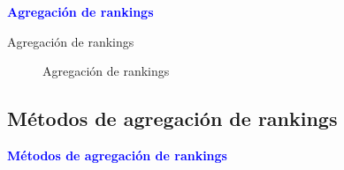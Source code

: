 \documentclass[10pt,hyperref={unicode}]{beamer}
\begin{document}
	\begin{frame}
		\begin{center}
			\Huge\textbf{\textsf{\textcolor{blue}{Agregación de rankings}}}
		\end{center}
	\end{frame}
	
		
		
		
	
	\begin{frame}{Agregación de rankings}
		\begin{figure}
			\centering
			\agregacionrankings
			\caption{Agregación de rankings}
			\label{fig:agregación_rankings}
		\end{figure}
	\end{frame}
	
	\subsection*{Métodos de agregación de rankings}
	
	\begin{frame}
		\begin{center}
			\Huge\textbf{\textsf{\textcolor{blue}{Métodos de agregación de rankings}}}
		\end{center}
	\end{frame}
	
	
\end{document}
